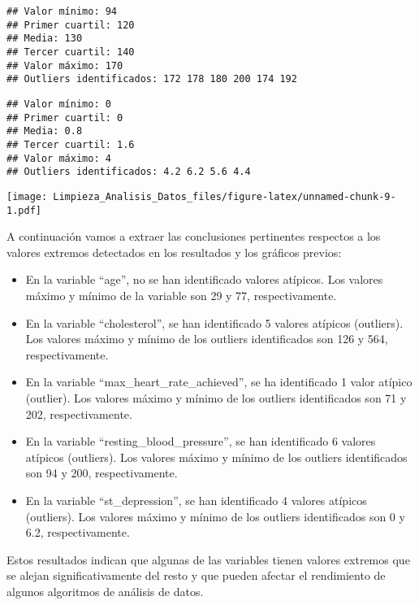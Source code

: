 \documentclass[
]{article}
\newenvironment{Shaded}{\begin{snugshade}}{\end{snugshade}}
\newcommand{\FunctionTok}[1]{\textcolor[rgb]{0.00,0.00,0.00}{#1}}
\newcommand{\NormalTok}[1]{#1}
\newcommand{\SpecialCharTok}[1]{\textcolor[rgb]{0.00,0.00,0.00}{#1}}
\newcommand{\StringTok}[1]{\textcolor[rgb]{0.31,0.60,0.02}{#1}}
\begin{document}
\begin{verbatim}
## Valor mínimo: 94 
## Primer cuartil: 120 
## Media: 130 
## Tercer cuartil: 140 
## Valor máximo: 170 
## Outliers identificados: 172 178 180 200 174 192
\end{verbatim}

\begin{Shaded}
\end{Shaded}

\begin{verbatim}
## Valor mínimo: 0 
## Primer cuartil: 0 
## Media: 0.8 
## Tercer cuartil: 1.6 
## Valor máximo: 4 
## Outliers identificados: 4.2 6.2 5.6 4.4
\end{verbatim}

\texttt{[image: Limpieza\_Analisis\_Datos\_files/figure-latex/unnamed-chunk-9-1.pdf]}

A continuación vamos a extraer las conclusiones pertinentes respectos a
los valores extremos detectados en los resultados y los gráficos
previos:

\begin{itemize}
\item
  En la variable ``age'', no se han identificado valores atípicos. Los
  valores máximo y mínimo de la variable son 29 y 77, respectivamente.
\item
  En la variable ``cholesterol'', se han identificado 5 valores atípicos
  (outliers). Los valores máximo y mínimo de los outliers identificados
  son 126 y 564, respectivamente.
\item
  En la variable ``max\_heart\_rate\_achieved'', se ha identificado 1
  valor atípico (outlier). Los valores máximo y mínimo de los outliers
  identificados son 71 y 202, respectivamente.
\item
  En la variable ``resting\_blood\_pressure'', se han identificado 6
  valores atípicos (outliers). Los valores máximo y mínimo de los
  outliers identificados son 94 y 200, respectivamente.
\item
  En la variable ``st\_depression'', se han identificado 4 valores
  atípicos (outliers). Los valores máximo y mínimo de los outliers
  identificados son 0 y 6.2, respectivamente.
\end{itemize}

Estos resultados indican que algunas de las variables tienen valores
extremos que se alejan significativamente del resto y que pueden afectar
el rendimiento de algunos algoritmos de análisis de datos.
\end{document}
